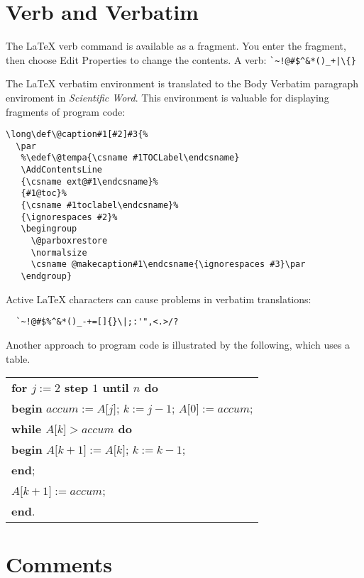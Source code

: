 \documentclass{article}
\begin{document}
\section{Verb and Verbatim}

The \LaTeX{} \TEXTsymbol{\backslash}verb command is available as a fragment.
You enter the fragment, then choose Edit Properties to change the contents.
A \TEXTsymbol{\backslash}verb: \verb"`~!@#$^&*()_+|\{}"

The \LaTeX{} verbatim environment is translated to the Body Verbatim
paragraph enviroment in \textsl{Scientific Word\/}{}. This environment is
valuable for displaying fragments of program code:
\begin{verbatim}
\long\def\@caption#1[#2]#3{%
  \par
   %\edef\@tempa{\csname #1TOCLabel\endcsname}
   \AddContentsLine
   {\csname ext@#1\endcsname}%
   {#1@toc}%
   {\csname #1toclabel\endcsname}%
   {\ignorespaces #2}%
   \begingroup
     \@parboxrestore
     \normalsize
     \csname @makecaption#1\endcsname{\ignorespaces #3}\par
   \endgroup}
\end{verbatim}

Active \LaTeX{} characters can cause problems in verbatim translations:
\begin{verbatim}
  `~!@#$%^&*()_-+=[]{}\|;:'",<.>/?
\end{verbatim}

Another approach to program code is illustrated by the following, which uses
a table.

\begin{center}
\begin{tabular}{l}
\textbf{for $j:=2$ step $1$ until $n$ do} \\ 
\quad \textbf{begin} $\mathit{accum}:=A\lbrack j\rbrack $; $k:=j-1$; $%
A\lbrack 0\rbrack :=\mathit{accum}$; \\ 
\quad \textbf{while $A\lbrack k\rbrack >\mathit{accum}$ do} \\ 
\qquad \textbf{begin} $A\lbrack k+1\rbrack :=A\lbrack k\rbrack $; $k:=k-1$;
\\ 
\qquad \textbf{end}; \\ 
\quad $A\lbrack k+1\rbrack :=\mathit{accum}$; \\ 
\quad \textbf{end}.%
\end{tabular}
\end{center}

\section{Comments}
\end{document}
